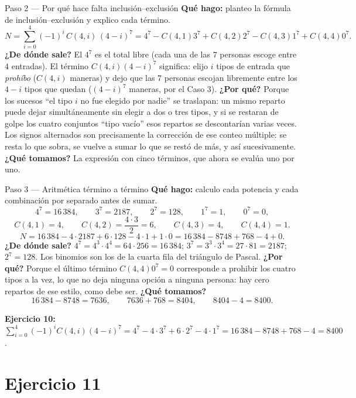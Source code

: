 \documentclass[11pt]{article}
\begin{document}
\begin{paso}{Paso 2 --- Por qué hace falta inclusión--exclusión}
\textbf{Qué hago:} planteo la fórmula de inclusión--exclusión y explico cada término.
\[
N=\sum_{i=0}^{4}(-1)^i\,C(4,i)\,(4-i)^7=4^7-C(4,1)3^7+C(4,2)2^7-C(4,3)1^7+C(4,4)0^7 .
\]
\textbf{¿De dónde sale?} El $4^7$ es el total libre (cada una de las $7$ personas escoge entre $4$ entradas). El término $C(4,i)(4-i)^7$ significa: elijo $i$ tipos de entrada que \emph{prohíbo} ($C(4,i)$ maneras) y dejo que las $7$ personas escojan libremente entre los $4-i$ tipos que quedan ($(4-i)^7$ maneras, por el Caso 3).
\textbf{¿Por qué?} Porque los sucesos ``el tipo $i$ no fue elegido por nadie'' se traslapan: un mismo reparto puede dejar simultáneamente sin elegir a dos o tres tipos, y si se restaran de golpe los cuatro conjuntos ``tipo vacío'' esos repartos se descontarían varias veces. Los signos alternados son precisamente la corrección de ese conteo múltiple: se resta lo que sobra, se vuelve a sumar lo que se restó de más, y así sucesivamente.
\textbf{¿Qué tomamos?} La expresión con cinco términos, que ahora se evalúa uno por uno.
\end{paso}

\begin{paso}{Paso 3 --- Aritmética término a término}
\textbf{Qué hago:} calculo cada potencia y cada combinación por separado antes de sumar.
\[
4^7=16\,384,\qquad 3^7=2187,\qquad 2^7=128,\qquad 1^7=1,\qquad 0^7=0 ,
\]
\[
C(4,1)=4,\qquad C(4,2)=\frac{4\cdot3}{2}=6,\qquad C(4,3)=4,\qquad C(4,4)=1 .
\]
\[
N=16\,384-4\cdot 2187+6\cdot 128-4\cdot 1+1\cdot 0
=16\,384-8748+768-4+0 .
\]
\textbf{¿De dónde sale?} $4^7=4^3\cdot4^4=64\cdot256=16\,384$; $3^7=3^3\cdot3^4=27\cdot81=2187$; $2^7=128$. Los binomios son los de la cuarta fila del triángulo de Pascal.
\textbf{¿Por qué?} Porque el último término $C(4,4)0^7=0$ corresponde a prohibir los cuatro tipos a la vez, lo que no deja ninguna opción a ninguna persona: hay cero repartos de ese estilo, como debe ser.
\textbf{¿Qué tomamos?}
\[
16\,384-8748=7636,\qquad 7636+768=8404,\qquad 8404-4=8400 .
\]
\end{paso}

\begin{resp}
\textbf{Ejercicio 10:} $\displaystyle\sum_{i=0}^{4}(-1)^iC(4,i)(4-i)^7=4^7-4\cdot3^7+6\cdot 2^7-4\cdot 1^7=16\,384-8748+768-4=8400$.
\end{resp}

\section*{Ejercicio 11}
\end{document}
